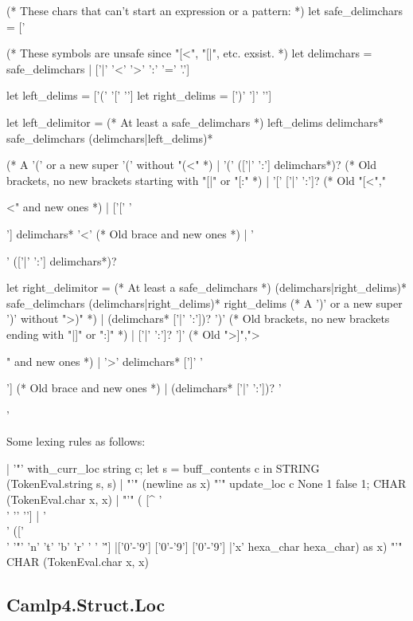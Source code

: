 \begin{ocamlcode}
  (* These chars that can't start an expression or a pattern: *)
  let safe_delimchars = ['%

  (* These symbols are unsafe since "[<", "[|", etc. exsist. *)
  let delimchars = safe_delimchars | ['|' '<' '>' ':' '=' '.']

  let left_delims  = ['(' '[' '{']
  let right_delims = [')' ']' '}']

  let left_delimitor =
    (* At least a safe_delimchars *)
    left_delims delimchars* safe_delimchars (delimchars|left_delims)*

  (* A '(' or a new super '(' without "(<" *)
  | '(' (['|' ':'] delimchars*)?
  (* Old brackets, no new brackets starting with "[|" or "[:" *)
  | '[' ['|' ':']?
  (* Old "[<","{<" and new ones *)
  | ['[' '{'] delimchars* '<'
  (* Old brace and new ones *)
  | '{' (['|' ':'] delimchars*)?

  let right_delimitor =
    (* At least a safe_delimchars *)
    (delimchars|right_delims)* safe_delimchars (delimchars|right_delims)* right_delims
  (* A ')' or a new super ')' without ">)" *)
  | (delimchars* ['|' ':'])? ')'
  (* Old brackets, no new brackets ending with "|]" or ":]" *)
  | ['|' ':']? ']'
  (* Old ">]",">}" and new ones *)
  | '>' delimchars* [']' '}']
  (* Old brace and new ones *)
  | (delimchars* ['|' ':'])? '}'
  
\end{ocamlcode}

Some lexing rules as follows:

\begin{ocamlcode}
    | '"'
        { with_curr_loc string c;
          let s = buff_contents c in STRING (TokenEval.string s, s)             }
    | "'" (newline as x) "'"
        { update_loc c None 1 false 1; CHAR (TokenEval.char x, x)               }
    | "'" ( [^ '\\' '' '']
          | '\\' (['\\' '"' 'n' 't' 'b' 'r' ' ' '\'']
                |['0'-'9'] ['0'-'9'] ['0'-'9']
                |'x' hexa_char hexa_char)
          as x) "'"                                { CHAR (TokenEval.char x, x) }
  
\end{ocamlcode}

        
\subsection{Camlp4.Struct.Loc}
\label{Camlp4.Struct.Loc}



